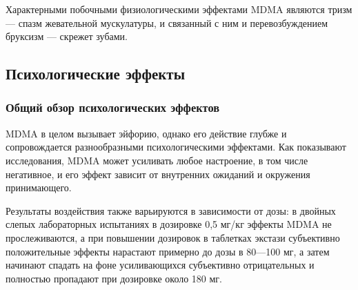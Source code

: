 \documentclass[a4paper,14pt,russian]{report}
\begin{document}
Характерными побочными физиологическими эффектами MDMA являются тризм — спазм жевательной мускулатуры, и связанный с ним и перевозбуждением бруксизм — скрежет зубами.

\subsection{Психологические эффекты}

\subsubsection{Общий обзор психологических эффектов}

MDMA в целом вызывает эйфорию, однако его действие глубже и сопровождается разнообразными психологическими эффектами. Как показывают исследования, MDMA может усиливать любое настроение, в том числе негативное, и его эффект зависит от внутренних ожиданий и окружения принимающего.

Результаты воздействия также варьируются в зависимости от дозы: в двойных слепых лабораторных испытаниях в дозировке 0,5 мг/кг эффекты MDMA не прослеживаются, а при повышении дозировок в таблетках экстази субъективно положительные эффекты нарастают примерно до дозы в 80—100 мг, а затем начинают спадать на фоне усиливающихся субъективно отрицательных и полностью пропадают при дозировке около 180 мг.
\end{document}
